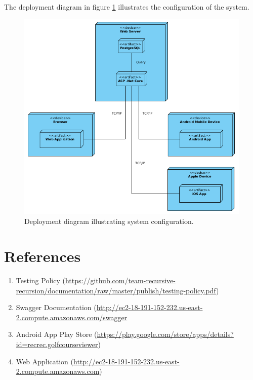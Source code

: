 \documentclass{article}
\begin{document}
    The deployment diagram in figure \ref{fig:depdia} illustrates the
    configuration of the system.

    \begin{center}
        \begin{figure}[H]
            \centering
            \includegraphics[scale=0.5]{DeploymentDiagram}
            \caption{Deployment diagram illustrating system configuration.}
            \label{fig:depdia}
        \end{figure}
    \end{center}

    \newpage

    \section{References}

    \begin{enumerate}
        \item Testing Policy
        (\url{https://github.com/team-recursive-recursion/documentation/raw/master/publish/testing-policy.pdf})
		\item Swagger Documentation
		(\url{http://ec2-18-191-152-232.us-east-2.compute.amazonaws.com/swagger}
		\item Android App Play Store
		(\url{https://play.google.com/store/apps/details?id=recrec.golfcourseviewer})
		\item Web Application
		(\url{http://ec2-18-191-152-232.us-east-2.compute.amazonaws.com})
    \end{enumerate}
\end{document}
